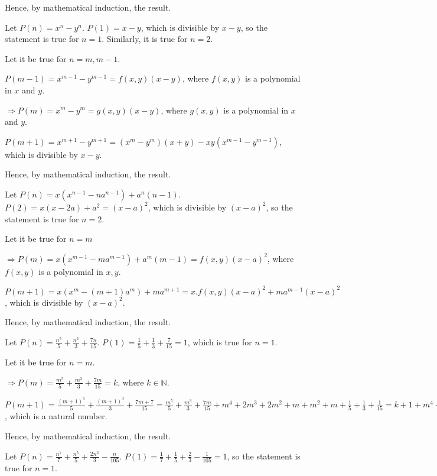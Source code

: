   Hence, by mathematical induction, the result.
\item Let $P(n) = x^n - y^n$. $P(1) = x - y$, which is divisible by $x - y$, so the statement is true for $n
  = 1$. Similarly, it is true for $n = 2$.

  Let it be true for $n = m, m - 1$.

  $P(m - 1) = x^{m - 1} - y^{m - 1} = f(x, y)(x - y)$, where $f(x, y)$ is a polynomial in $x$ and $y$.

  $\Rightarrow P(m) = x^m - y^m = g(x, y)(x - y)$, where $g(x, y)$ is a polynomial in $x$ and $y$.

  $P(m + 1) = x^{m + 1} - y^{m + 1} = (x^m - y^m)(x + y) - xy(x^{m - 1} - y^{m - 1})$, which is divisible by
  $x - y$.

  Hence, by mathematical induction, the result.
\item Let $P(n) = x(x^{n - 1} - na^{n - 1}) + a^n(n - 1)$. $P(2) = x(x - 2a) + a^2 = (x - a)^2$, which is
  divisible by $(x - a)^2$, so the statement is true for $n = 2$.

  Let it be true for $n = m$

  $\Rightarrow P(m) = x(x^{m - 1} - ma^{m - 1}) + a^m(m - 1) = f(x, y)(x - a)^2$, where $f(x, y)$ is a
  polynomial in $x, y$.

  $P(m + 1) = x(x^m - (m + 1)a^m) + ma^{m + 1} = x.f(x, y)(x - a)^2 + ma^{m - 1}(x - a)^2$, which is
  divisible by $(x - a)^2$.

  Hence, by mathematical induction, the result.
\item Let $P(n) = \frac{n^5}{5} + \frac{n^3}{3} + \frac{7n}{15}$. $P(1) = \frac{1}{5} + \frac{1}{3} +
  \frac{7}{15} = 1$, which is true for $n = 1$.

  Let it be true for $n = m$.

  $\Rightarrow P(m) = \frac{m^5}{5} + \frac{m^3}{3} + \frac{7m}{15} = k$, where $k\in\mathbb{N}$.

  $P(m + 1) = \frac{(m + 1)^5}{5} + \frac{(m + 1)^3}{3} + \frac{7m + 7}{15} = \frac{m^5}{5} + \frac{m^3}{3}
  + \frac{7m}{15} + m^4 + 2m^3 + 2m^2 + m + m^2 + m + \frac{1}{5} + \frac{1}{3} + \frac{1}{15} = k + 1 + m^4
  + 2m^3 + 3m^2 + 2m$, which is a natural number.

  Hence, by mathematical induction, the result.
\item Let $P(n) = \frac{n^7}{7} + \frac{n^5}{5} + \frac{2n^3}{3} - \frac{n}{105}$. $P(1) = \frac{1}{7} +
  \frac{1}{5} + \frac{2}{3} - \frac{1}{105} = 1$, so the statement is true for $n = 1$.


